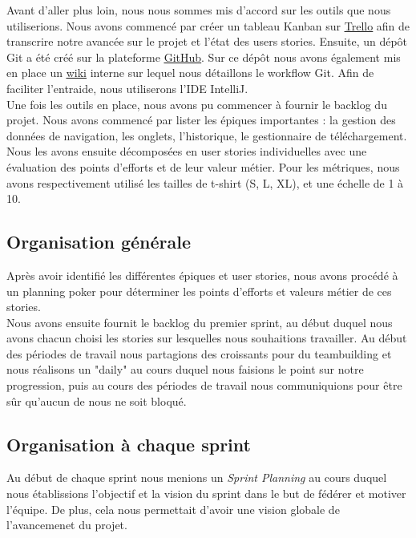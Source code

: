 \documentclass[10pt,a4paper]{article}
\begin{document}
Avant d’aller plus loin, nous nous sommes mis d’accord sur les outils que nous utiliserions. Nous avons commencé par créer un tableau Kanban sur \href{https://trello.com/b/HyinoLEE/navigateur}{\underline{Trello}} afin de transcrire notre avancée sur le projet et l'état des users stories. Ensuite, un dépôt Git a été créé sur la plateforme \href{https://github.com/simjnd/navigateur/}{\underline{GitHub}}. Sur ce dépôt nous avons également mis en place un \href{https://github.com/simjnd/navigateur/wiki}{\underline{wiki}} interne sur lequel nous détaillons le workflow Git. Afin de faciliter l'entraide, nous utiliserons l'IDE IntelliJ. \\

Une fois les outils en place, nous avons pu commencer à fournir le backlog du projet. Nous avons commencé par lister les épiques importantes : la gestion des données de navigation, les onglets, l’historique, le gestionnaire de téléchargement. Nous les avons ensuite décomposées en user stories individuelles avec une évaluation des points d’efforts et de leur valeur métier. Pour les métriques, nous avons respectivement utilisé les tailles de t-shirt (S, L, XL), et une échelle de 1 à 10.


\subsection{Organisation générale}

Après avoir identifié les différentes épiques et user stories, nous avons procédé à un planning poker pour déterminer les points d'efforts et valeurs métier de ces stories. \\
Nous avons ensuite fournit le backlog du premier sprint, au début duquel nous avons chacun choisi les stories sur lesquelles nous souhaitions travailler. Au début des périodes de travail nous partagions des croissants pour du teambuilding et nous réalisons un "daily" au cours duquel nous faisions le point sur notre progression, puis au cours des périodes de travail nous communiquions pour être sûr qu'aucun de nous ne soit bloqué.

\subsection{Organisation à chaque sprint}
Au début de chaque sprint nous menions un \textit{Sprint Planning} au cours duquel nous établissions l’objectif et la vision du sprint dans le but de fédérer et motiver l’équipe. De plus, cela nous permettait d'avoir une vision globale de l'avancemenet du projet. \\
\end{document}

